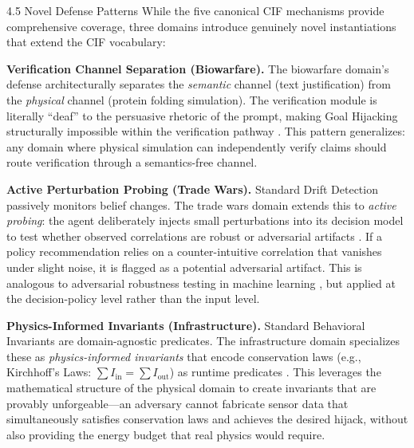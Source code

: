 \documentclass[
  ignorenonframetext,
]{beamer}
\begin{document}
\begin{frame}[allowframebreaks]{4.5 Novel Defense Patterns}
\protect{}\label{novel-defense-patterns}
While the five canonical CIF mechanisms provide comprehensive coverage,
three domains introduce genuinely novel instantiations that extend the
CIF vocabulary:

\textbf{Verification Channel Separation (Biowarfare).} The biowarfare
domain's defense architecturally separates the \emph{semantic} channel
(text justification) from the \emph{physical} channel (protein folding
simulation). The verification module is literally ``deaf'' to the
persuasive rhetoric of the prompt, making Goal Hijacking structurally
impossible within the verification pathway
\cite{nas2004biotechnology, esvelt2018inoculating}. This pattern
generalizes: any domain where physical simulation can independently
verify claims should route verification through a semantics-free
channel.

\textbf{Active Perturbation Probing (Trade Wars).} Standard Drift
Detection passively monitors belief changes. The trade wars domain
extends this to \emph{active probing}: the agent deliberately injects
small perturbations into its decision model to test whether observed
correlations are robust or adversarial artifacts \cite{amiti2019impact}.
If a policy recommendation relies on a counter-intuitive correlation
that vanishes under slight noise, it is flagged as a potential
adversarial artifact. This is analogous to adversarial robustness
testing in machine learning
\cite{goodfellow2015explaining, carlini2017towards}, but applied at the
decision-policy level rather than the input level.

\textbf{Physics-Informed Invariants (Infrastructure).} Standard
Behavioral Invariants are domain-agnostic predicates. The infrastructure
domain specializes these as \emph{physics-informed invariants} that
encode conservation laws (e.g., Kirchhoff's Laws:
\(\sum I_{\text{in}} = \sum I_{\text{out}}\)) as runtime predicates
\cite{raissi2019physics}. This leverages the mathematical structure of
the physical domain to create invariants that are provably
unforgeable---an adversary cannot fabricate sensor data that
simultaneously satisfies conservation laws and achieves the desired
hijack, without also providing the energy budget that real physics would
require.
\end{frame}
\end{document}
